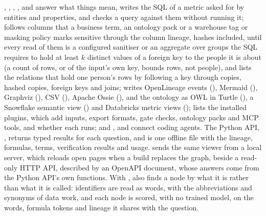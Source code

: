 ,
, , , 
and  answer what things mean,  writes the
SQL of a metric asked for by entities and properties, and
 checks a query against them without running it;
 follows columns that a business term, an ontology pack or a warehouse
tag or masking policy marks sensitive through the column lineage, hashes included, until every
read of them is a configured sanitiser or an aggregate over groups the SQL requires to hold at
least $k$ distinct values of a foreign key to the people it is about (a count of rows, or of the
input's own key, bounds rows, not people), and
 lists the relations that hold one person's rows by following a key
through copies, hashed copies, foreign keys and joins;
 writes OpenLineage events (), Mermaid (),
Graphviz (), CSV (), Apache Ossie (), and the ontology as OWL in
Turtle (), a Snowflake semantic view () and Databricks metric views
(); 
lists the installed plugins, which add inputs, export formats, gate checks, ontology packs and
MCP tools, and whether each runs; and ,  and
 connect coding agents. The Python API, , returns
typed results for each question, and  is one offline file with the lineage,
formulas, terms, verification results and usage.  sends the same viewer from
a local server, which reloads open pages when a build replaces the graph, beside a read-only HTTP
API, described by an OpenAPI document, whose answers come from the Python API's own functions.
With ,  also finds a node by what it is rather than what it
is called: identifiers are read as words, with the abbreviations and synonyms of data work, and
each node is scored, with no trained model, on the words, formula tokens and lineage it shares
with the question.

